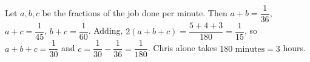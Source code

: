 Let $a,b,c$ be the fractions of the job done per minute. Then $a+b=\dfrac1{36}$, $a+c=\dfrac1{45}$, $b+c=\dfrac1{60}$. Adding, $2(a+b+c)=\dfrac{5+4+3}{180}=\dfrac1{15}$, so $a+b+c=\dfrac1{30}$ and $c=\dfrac1{30}-\dfrac1{36}=\dfrac1{180}$. Chris alone takes $\boxed{180\text{ minutes}}=3$ hours.
